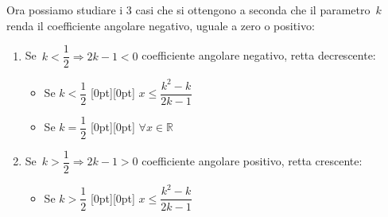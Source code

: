        {}
       {}

Ora possiamo studiare i 3 casi che si ottengono a seconda che il 
parametro~\(k\) renda il coefficiente angolare negativo, uguale a zero 
o positivo:

\begin{enumerate}
\item Se~\(k < \dfrac{1}{2} \Rightarrow 2 k - 1 < 0\)
coefficiente angolare negativo, retta decrescente:

       {}
       {}

\vspace{-2em}
\begin{itemize} [nosep]
\item 
Se \quad \(k < \dfrac{1}{2}\) \qquad 
\raisebox{-9pt}[0pt][0pt]{
}
\qquad \(x \le \dfrac{k^2 - k}{2 k - 1}\)
\end{itemize}

       {\segnineg}
       {}

\vspace{-2em}
\begin{itemize} [nosep]
\item 
Se \quad \(k = \dfrac{1}{2}\) \qquad 
\raisebox{-20pt}[0pt][0pt]{
}
\qquad \(\forall x \in \mathbb{R}\)
\end{itemize}

\item Se~\(k > \dfrac{1}{2} \Rightarrow 2 k - 1 > 0\)
coefficiente angolare positivo, retta crescente:

       {}
       {}

\vspace{-2em}
\begin{itemize} [nosep]
\item 
Se \quad \(k > \dfrac{1}{2}\) \qquad 
\raisebox{-9pt}[0pt][0pt]{
}
\qquad \(x \le \dfrac{k^2 - k}{2 k - 1}\)
\end{itemize}

\end{enumerate}

%

